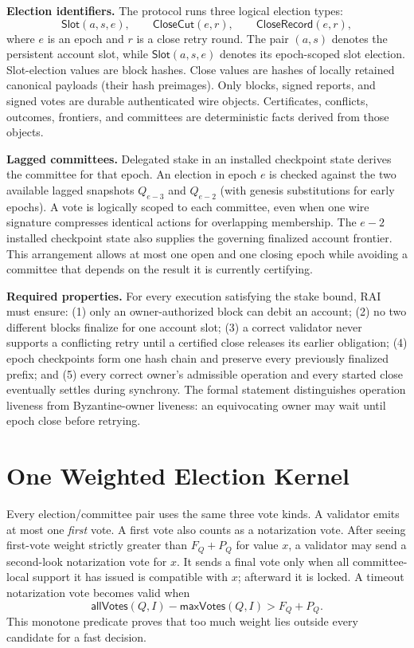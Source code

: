 \documentclass[sigplan,review,anonymous]{acmart}
\newcommand{\sys}{\textsc{RAI}\xspace}
\newcommand{\Slot}{\mathsf{Slot}}
\newcommand{\Cut}{\mathsf{CloseCut}}
\newcommand{\Record}{\mathsf{CloseRecord}}
\newcommand{\paragraphhead}[1]{\smallskip\noindent\textbf{#1}}
\begin{document}
\paragraphhead{Election identifiers.}
The protocol runs three logical election types:
\[
 \Slot(a,s,e), \qquad \Cut(e,r), \qquad \Record(e,r),
\]
where $e$ is an epoch and $r$ is a close retry round.  The pair $(a,s)$ denotes the persistent account slot, while $\Slot(a,s,e)$ denotes its epoch-scoped slot election.  Slot-election values are block hashes.  Close values are hashes of locally retained canonical payloads (their hash preimages).  Only blocks, signed reports, and signed votes are durable authenticated wire objects.  Certificates, conflicts, outcomes, frontiers, and committees are deterministic facts derived from those objects.

\paragraphhead{Lagged committees.}
Delegated stake in an installed checkpoint state derives the committee for that epoch.  An election in epoch $e$ is checked against the two available lagged snapshots $Q_{e-3}$ and $Q_{e-2}$ (with genesis substitutions for early epochs).  A vote is logically scoped to each committee, even when one wire signature compresses identical actions for overlapping membership.  The $e-2$ installed checkpoint state also supplies the governing finalized account frontier.  This arrangement allows at most one open and one closing epoch while avoiding a committee that depends on the result it is currently certifying.

\paragraphhead{Required properties.}
For every execution satisfying the stake bound, \sys must ensure: (1) only an owner-authorized block can debit an account; (2) no two different blocks finalize for one account slot; (3) a correct validator never supports a conflicting retry until a certified close releases its earlier obligation; (4) epoch checkpoints form one hash chain and preserve every previously finalized prefix; and (5) every correct owner's admissible operation and every started close eventually settles during synchrony.  The formal statement distinguishes operation liveness from Byzantine-owner liveness: an equivocating owner may wait until epoch close before retrying.

\section{One Weighted Election Kernel}
\label{sec:kernel}

Every election/committee pair uses the same three vote kinds.  A validator emits at most one \emph{first} vote.  A first vote also counts as a notarization vote.  After seeing first-vote weight strictly greater than $F_Q+P_Q$ for value $x$, a validator may send a second-look notarization vote for $x$.  It sends a final vote only when all committee-local support it has issued is compatible with $x$; afterward it is locked.  A timeout notarization vote becomes valid when
\begin{equation}
 \mathsf{allVotes}(Q,I)-\mathsf{maxVotes}(Q,I)>F_Q+P_Q.
 \label{eq:timeout}
\end{equation}
This monotone predicate proves that too much weight lies outside every candidate for a fast decision.
\end{document}

